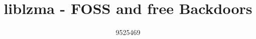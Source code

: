 

\title{liblzma - FOSS and free Backdoors}
\author{9525469}


    \maketitle

    

    \printbibliography

    


